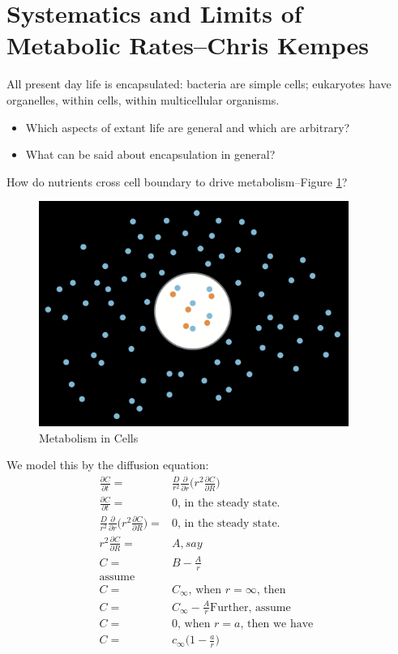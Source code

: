 \documentclass[]{article}
\begin{document}
\section{Systematics and Limits of Metabolic Rates--Chris Kempes}

All present day life is encapsulated: bacteria are simple cells; eukaryotes have organelles, within cells, within multicellular organisms.
\begin{itemize}
	\item Which aspects of extant life are general and 	which are arbitrary?
	\item What can be said about encapsulation in general?
\end{itemize}

How do nutrients cross cell boundary to drive metabolism--Figure \ref{fig:Encapsulation1}?
\begin{figure}[H]
	\caption{Metabolism in Cells} \label{fig:Encapsulation1} 
	\includegraphics[width=0.9\textwidth]{Encapsulation1}
\end{figure}

We model this by the diffusion equation:
\begin{align*}
\frac{\partial C}{\partial t} =& \frac{D}{r^2} \frac{\partial}{\partial r}\big(r^2 \frac{\partial C}{\partial R} \big) \\
\frac{\partial C}{\partial t} =& 0 \text{, in the steady state.}\\
 \frac{D}{r^2} \frac{\partial}{\partial r}\big(r^2 \frac{\partial C}{\partial R} \big) =& 0 \text{, in the steady state.}\\
 r^2 \frac{\partial C}{\partial R} =& A {, say}\\
 C =& B - \frac{A}{r}\\
 \text{assume}& \\
 C =& C_{\infty}\text{, when $r=\infty$, then}\\
 C =& C_{\infty} - \frac{A}{r}
 \text{Further, assume}&\\
 C =& 0\text{, when $r=a$, then we have}\\
 C =& c_{\infty}\big(1 - \frac{a}{r}\big) 
\end{align*}
\end{document}

